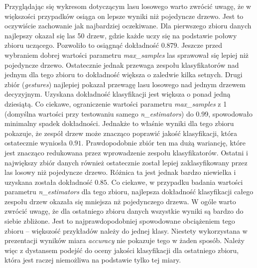 \documentclass{classrep}
\begin{document}
{{            Przyglądając się wykresom dotyczącym lasu losowego warto zwrócić uwagę, że
            w większości przypadków osiąga on lepsze wyniki niż pojedyncze drzewo. Jest
            to oczywiście zachowanie jak najbardziej oczekiwane. Dla pierwszego zbioru
            danych najlepszy okazał się las 50 drzew, gdzie każde uczy się na podstawie
            połowy zbioru uczącego. Pozwoliło to osiągnąć dokładność $0.879$. Jeszcze
            przed wybraniem dobrej wartości parametru \emph{max\_samples} las sprawował
            się lepiej niż pojedyncze drzewo. Ostatecznie jednak przewaga zespołu
            klasyfikatorów nad jednym dla tego zbioru to dokładność większa o zaledwie
            kilka setnych. Drugi zbiór (\emph{gestures}) najlepiej pokazał przewagę
            lasu losowego nad jednym drzewem decyzyjnym. Uzyskana dokładność
            klasyfikacji jest większa o ponad jedną dziesiątą. Co ciekawe, ograniczenie
            wartości parametru \emph{max\_samples} z 1 (domyślna wartości przy
            testowaniu samego \emph{n\_estimators}) do 0.99, spowodowało minimalny
            spadek dokładności. Jednakże to właśnie wyniki dla tego zbioru pokazuje, że
            zespół drzew może znacząco poprawić jakość klasyfikacji, która ostatecznie
            wyniosła $0.91$. Prawdopodobnie zbiór ten ma dużą wariancję, które jest
            znacząco redukowana przez wprowadzenie zespołu klasyfikatorów. Ostatni i
            największy zbiór danych również ostatecznie został lepiej zaklasyfikowany
            przez las losowy niż pojedyncze drzewo. Różnica ta jest jednak bardzo
            niewielka i uzyskana została dokładność $0.85$. Co ciekawe, w przypadku
            badania wartości parametru \emph{n\_estimators} dla tego zbioru, najlepsza
            dokładność klasyfikacji całego zespołu drzew okazała się mniejsza nż
            pojedynczego drzewa. W ogóle warto zwrócić uwagę, że dla ostatniego zbioru
            danych wszystkie wyniki są bardzo do siebie zbliżone. Jest to
            najprawdopodobniej spowodowane obciążeniem tego zbioru -- większość
            przykładów należy do jednej klasy. Niestety wykorzystana w prezentacji
            wyników miara \emph{accuracy} nie pokazuje tego w żaden sposób. Należy więc
            z dystansem podejść do oceny jakości klasyfikacji dla ostatniego zbioru,
            która jest raczej niemożliwa na podstawie tylko tej miary.
        }
    }
\end{document}
